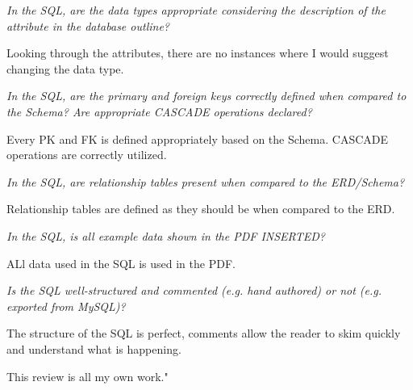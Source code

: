 \documentclass{article}
\begin{document}
\begin{tcolorbox}[colback=secondarycolor, colframe=primarycolor, title=\textbf{Step 2: Peer Review 3 - Tyler Grzymalski}]
\vspace{0.2cm}
\textit{In the SQL, are the data types appropriate considering the description of the attribute in the database outline?}

\vspace{0.05cm}
Looking through the attributes, there are no instances where I would suggest changing the data type.

\vspace{0.2cm}
\textit{In the SQL, are the primary and foreign keys correctly defined when compared to the Schema? Are appropriate CASCADE operations declared?}

\vspace{0.05cm}
Every PK and FK is defined appropriately based on the Schema. CASCADE operations are correctly utilized.

\vspace{0.2cm}
\textit{In the SQL, are relationship tables present when compared to the ERD/Schema?}

\vspace{0.05cm}
Relationship tables are defined as they should be when compared to the ERD. 

\vspace{0.2cm}
\textit{In the SQL, is all example data shown in the PDF INSERTED?}

\vspace{0.05cm}
ALl data used in the SQL is used in the PDF.

\vspace{0.2cm}
\textit{Is the SQL well-structured and commented (e.g. hand authored) or not (e.g. exported from MySQL)?}

\vspace{0.05cm}
The structure of the SQL is perfect, comments allow the reader to skim quickly and understand what is happening.
 
\vspace{0.2cm}
This review is all my own work."

\vspace{0.2cm}
\end{tcolorbox}

\vspace{0.5cm}


\end{document}
